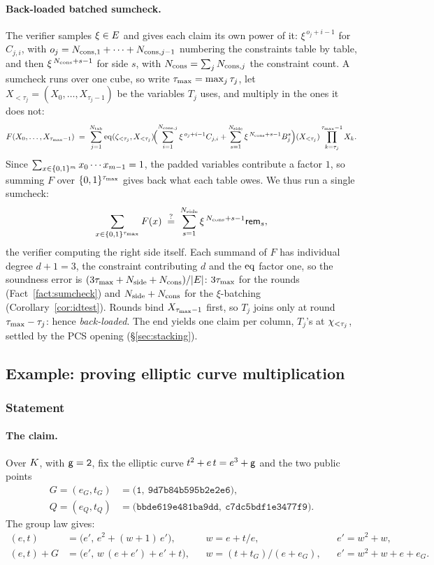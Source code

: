 \paragraph{Back-loaded batched sumcheck.} The verifier samples $\xi\in E$ and gives each claim its own power of it: $\xi^{\,o_j+i-1}$ for $C_{j,i}$, with $o_j=N_{\mathrm{cons},1}+\dots+N_{\mathrm{cons},j-1}$ numbering the constraints table by table, and then $\xi^{\,N_{\mathrm{cons}}+s-1}$ for side $s$, with $N_{\mathrm{cons}}=\sum_jN_{\mathrm{cons},j}$ the constraint count. A sumcheck runs over one cube, so write $\tau_{\max}=\max_j\tau_j$, let $X_{<\tau_j}=(X_0,\dots,X_{\tau_j-1})$ be the variables $T_j$ uses, and multiply in the ones it does not:
\[
  F(X_0,\dots,X_{\tau_{\max}-1})\;=\;\sum_{j=1}^{N_{\mathrm{tab}}}\operatorname{eq}(\zeta_{<\tau_j},X_{<\tau_j})\!
  \Bigl(\sum_{i=1}^{N_{\mathrm{cons},j}}\xi^{\,o_j+i-1}C_{j,i}+\sum_{s=1}^{N_{\mathrm{side}}}\xi^{\,N_{\mathrm{cons}}+s-1}B^{s}_j\Bigr)(X_{<\tau_j})
  \prod_{k=\tau_j}^{\tau_{\max}-1}X_k .
\]
Since $\sum_{x\in\{0,1\}^{m}}x_0\cdots x_{m-1}=1$, the padded variables contribute a factor $1$, so summing $F$ over $\{0,1\}^{\tau_{\max}}$ gives back what each table owes. We thus run a single sumcheck:
\[
  \sum_{x\in\{0,1\}^{\tau_{\max}}}F(x)\;\stackrel{?}{=}\;\sum_{s=1}^{N_{\mathrm{side}}}\xi^{\,N_{\mathrm{cons}}+s-1}\mathsf{rem}_{s},
\]
the verifier computing the right side itself. Each summand of $F$ has individual degree $d+1=3$, the constraint contributing $d$ and the $\operatorname{eq}$ factor one, so the soundness error is $(3\tau_{\max}+N_{\mathrm{side}}+N_{\mathrm{cons}})/|E|$: $3\tau_{\max}$ for the rounds (Fact~\ref{fact:sumcheck}) and $N_{\mathrm{side}}+N_{\mathrm{cons}}$ for the $\xi$-batching (Corollary~\ref{cor:idtest}). Rounds bind $X_{\tau_{\max}-1}$ first, so $T_j$ joins only at round $\tau_{\max}-\tau_j$: hence \emph{back-loaded}. The end yields one claim per column, $T_j$'s at $\chi_{<\tau_j}$, settled by the PCS opening (\S\ref{sec:stacking}).

\subsection{Example: proving elliptic curve multiplication}\label{sec:arith-example}

\subsubsection{Statement}

\paragraph{The claim.} Over $K$, with $\mathsf{g}=\mathtt{2}$, fix the elliptic curve $t^{2}+e\,t=e^{3}+\mathsf{g}$ and the two public points
\begin{align*}
  G=(e_G,t_G)&=\bigl(\mathtt{1},\ \mathtt{9d7b84b595b2e2e6}\bigr),\\
  Q=(e_Q,t_Q)&=\bigl(\mathtt{bbde619e481ba9dd},\ \mathtt{c7dc5bdf1e3477f9}\bigr).
\end{align*}
The group law gives:
\begin{align*}
  [2](e,t)&=\bigl(e',\,e^{2}+(w+1)\,e'\bigr), &&w=e+t/e, &&e'=w^{2}+w,\\
  (e,t)+G&=\bigl(e',\,w\,(e+e')+e'+t\bigr), &&w=(t+t_G)/(e+e_G), &&e'=w^{2}+w+e+e_G .
\end{align*}


